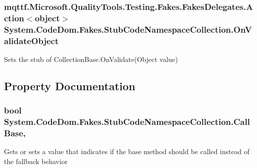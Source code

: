 \hypertarget{class_system_1_1_code_dom_1_1_fakes_1_1_stub_code_namespace_collection_a5049434db295684498acc79842833902}{
\subsubsection[{On\-Validate\-Object}]{\setlength{\rightskip}{0pt plus 5cm}mqttf.\-Microsoft.\-Quality\-Tools.\-Testing.\-Fakes.\-Fakes\-Delegates.\-Action$<$object$>$ System.\-Code\-Dom.\-Fakes.\-Stub\-Code\-Namespace\-Collection.\-On\-Validate\-Object}}\label{class_system_1_1_code_dom_1_1_fakes_1_1_stub_code_namespace_collection_a5049434db295684498acc79842833902}


Sets the stub of Collection\-Base.\-On\-Validate(\-Object value)



\subsection{Property Documentation}
\hypertarget{class_system_1_1_code_dom_1_1_fakes_1_1_stub_code_namespace_collection_a1edb4f4e89744357266c359a9c3829a8}{
\subsubsection[{Call\-Base}]{\setlength{\rightskip}{0pt plus 5cm}bool System.\-Code\-Dom.\-Fakes.\-Stub\-Code\-Namespace\-Collection.\-Call\-Base\hspace{0.3cm}{\ttfamily [get]}, {\ttfamily [set]}}}\label{class_system_1_1_code_dom_1_1_fakes_1_1_stub_code_namespace_collection_a1edb4f4e89744357266c359a9c3829a8}


Gets or sets a value that indicates if the base method should be called instead of the fallback behavior

